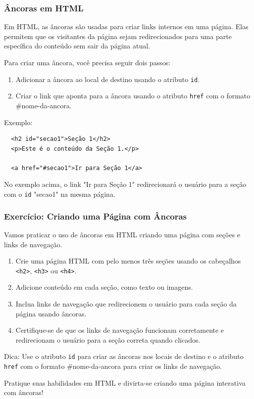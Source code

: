 \documentclass{beamer}
\begin{document}
\begin{frame}[fragile]
  \frametitle{Âncoras em HTML}

  Em HTML, as âncoras são usadas para criar links internos em uma página. Elas permitem que os visitantes da página sejam redirecionados para uma parte específica do conteúdo sem sair da página atual.

  Para criar uma âncora, você precisa seguir dois passos:

  \begin{enumerate}
    \item Adicionar a âncora ao local de destino usando o atributo \texttt{id}.
    \item Criar o link que aponta para a âncora usando o atributo \texttt{href} com o formato \#nome-da-ancora.
  \end{enumerate}

  \begin{block}{Exemplo:}
\begin{verbatim}
  <h2 id="secao1">Seção 1</h2>
  <p>Este é o conteúdo da Seção 1.</p>

  <a href="#secao1">Ir para Seção 1</a>
\end{verbatim}      
  \end{block}
  No exemplo acima, o link "Ir para Seção 1" redirecionará o usuário para a seção com o \texttt{id} "secao1" na mesma página.
\end{frame}

\begin{frame}[fragile]
  \frametitle{Exercício: Criando uma Página com Âncoras}

  Vamos praticar o uso de âncoras em HTML criando uma página com seções e links de navegação.

  \begin{enumerate}
    \item Crie uma página HTML com pelo menos três seções usando os cabeçalhos \texttt{<h2>}, \texttt{<h3>} ou \texttt{<h4>}.
    \item Adicione conteúdo em cada seção, como texto ou imagens.
    \item Inclua links de navegação que redirecionem o usuário para cada seção da página usando âncoras.
    \item Certifique-se de que os links de navegação funcionam corretamente e redirecionam o usuário para a seção correta quando clicados.
  \end{enumerate}

  Dica: Use o atributo \texttt{id} para criar as âncoras nos locais de destino e o atributo \texttt{href} com o formato \#nome-da-ancora para criar os links de navegação.

  Pratique suas habilidades em HTML e divirta-se criando uma página interativa com âncoras!
\end{frame}
\end{document}
